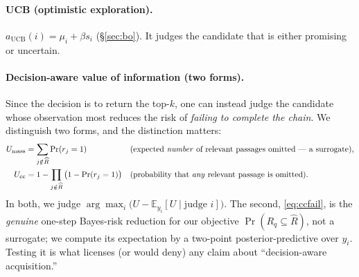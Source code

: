 \documentclass[11pt]{article}
\newcommand{\E}{\mathbb{E}}
\begin{document}
\paragraph{UCB (optimistic exploration).} $a_{\mathrm{UCB}}(i)=\mu_i+\beta s_i$ (\S\ref{sec:bo}). It judges the
candidate that is either promising or uncertain.

\paragraph{Decision-aware value of information (two forms).} Since the decision is to return the top-$k$, one
can instead judge the candidate whose observation most reduces the risk of \emph{failing to complete the
chain}. We distinguish two forms, and the distinction matters:
\begin{align}
  U_{\text{mass}} &= \sum_{j\notin\widehat R}\Pr(r_j=1) &&\text{(expected \emph{number} of relevant passages omitted --- a surrogate),}\\
  U_{\text{cc}} &= 1 - \prod_{j\notin\widehat R}\big(1-\Pr(r_j=1)\big) &&\text{(probability that \emph{any} relevant passage is omitted).}\label{eq:ccfail}
\end{align}
In both, we judge $\arg\max_i\big(U-\E_{y_i}[U\mid\text{judge }i]\big)$. The second, \eqref{eq:ccfail}, is the
\emph{genuine} one-step Bayes-risk reduction for our objective $\Pr(R_q\subseteq\widehat R)$, not a surrogate;
we compute its expectation by a two-point posterior-predictive over $y_i$. Testing it is what licenses (or
would deny) any claim about ``decision-aware acquisition.''
\end{document}
